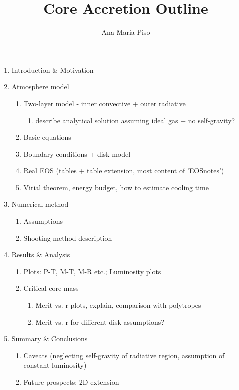 \documentclass[aps,prd,preprint]{revtex4}
\begin{document}
\title{Core Accretion Outline}
\author{Ana-Maria Piso}

\begin{enumerate}
\item Introduction \& Motivation
\item Atmosphere model
\begin{enumerate}
\item Two-layer model - inner convective + outer radiative
\begin{enumerate}
\item describe analytical solution assuming ideal gas + no self-gravity?
\end{enumerate}
\item Basic equations
\item Boundary conditions + disk model
\item Real EOS (tables + table extension, most content of 'EOSnotes')
\item Virial theorem, energy budget, how to estimate cooling time
\end{enumerate}
\item Numerical method
\begin{enumerate}
\item Assumptions
\item Shooting method description
\end{enumerate}
\item Results \& Analysis
\begin{enumerate}
\item Plots: P-T, M-T, M-R etc.; Luminosity plots
\item Critical core mass
\begin{enumerate}
\item Mcrit vs. r plots, explain, comparison with polytropes
\item Mcrit vs. r for different disk assumptions?
\end{enumerate}
\end{enumerate}
\item Summary \& Conclusions
\begin{enumerate}
\item Caveats (neglecting self-gravity of radiative region, assumption of constant luminosity)
\item Future prospects: 2D extension
\end{enumerate}
\end{enumerate}
\end{document}
